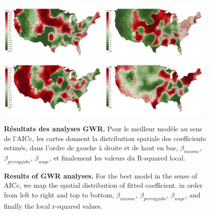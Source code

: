 \begin{figure}
\centering
\includegraphics[width=0.48\textwidth]{Figures/EnergyPrice/gwr_allbest_betaincome}
\includegraphics[width=0.48\textwidth]{Figures/EnergyPrice/gwr_allbest_betapercapjobs}\\
\includegraphics[width=0.48\textwidth]{Figures/EnergyPrice/gwr_allbest_wage}
\includegraphics[width=0.48\textwidth]{Figures/EnergyPrice/gwr_allbest_LocalR2}
\caption{\textbf{Results of GWR analyses.} For the best model in the sense of AICc, we map the spatial distribution of fitted coefficient, in order from left to right and top to bottom, $\beta_{income}$, $\beta_{percapjobs}$, $\beta_{wage}$, and finally the local r-squared values.}{\textbf{Résultats des analyses GWR.} Pour le meilleur modèle au sens de l'AICc, les cartes donnent la distribution spatiale des coefficients estimés, dans l'ordre de gauche à droite et de haut en bas, $\beta_{income}$, $\beta_{percapjobs}$, $\beta_{wage}$, et finalement les valeurs du R-squared local.}
\label{fig:gwr}
\end{figure}

